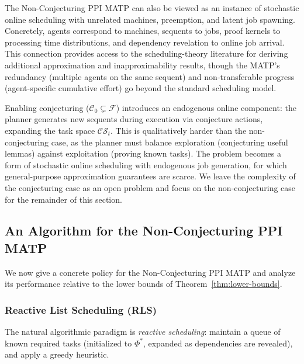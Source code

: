 \begin{remark}
The Non-Conjecturing PPI MATP can also be viewed as an instance of stochastic online scheduling with unrelated machines, preemption, and latent job spawning. Concretely, agents correspond to machines, sequents to jobs, proof kernels to processing time distributions, and dependency revelation to online job arrival. This connection provides access to the scheduling-theory literature for deriving additional approximation and inapproximability results, though the MATP's redundancy (multiple agents on the same sequent) and non-transferable progress (agent-specific cumulative effort) go beyond the standard scheduling model.
\end{remark}

\begin{remark}
Enabling conjecturing ($\mathcal{C}_0 \subsetneq \mathcal{F}$) introduces an endogenous online component: the planner generates new sequents during execution via conjecture actions, expanding the task space $\mathcal{CS}_t$. This is qualitatively harder than the non-conjecturing case, as the planner must balance exploration (conjecturing useful lemmas) against exploitation (proving known tasks). The problem becomes a form of stochastic online scheduling with endogenous job generation, for which general-purpose approximation guarantees are scarce. We leave the complexity of the conjecturing case as an open problem and focus on the non-conjecturing case for the remainder of this section.
\end{remark}


\subsection{An Algorithm for the Non-Conjecturing PPI MATP}\label{sec:algorithm}

We now give a concrete policy for the Non-Conjecturing PPI MATP and analyze its performance relative to the lower bounds of Theorem~\ref{thm:lower-bounds}.


\subsubsection{Reactive List Scheduling (RLS)}

The natural algorithmic paradigm is \emph{reactive scheduling}: maintain a queue of known required tasks (initialized to $\Phi^*$, expanded as dependencies are revealed), and apply a greedy heuristic.

